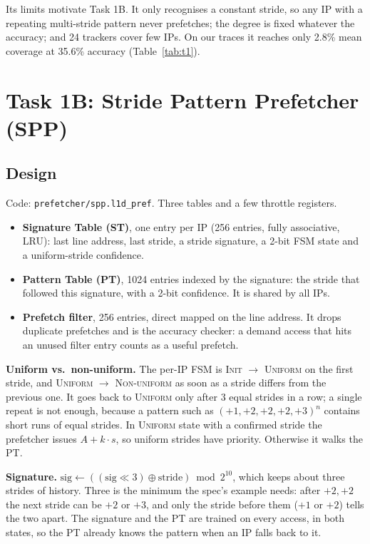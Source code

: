 \documentclass[12pt]{report}
\newcommand{\cfg}[1]{\texttt{#1}}
\begin{document}
Its limits motivate Task 1B. It only recognises a constant stride, so any IP
with a repeating multi-stride pattern never prefetches; the degree is fixed
whatever the accuracy; and 24 trackers cover few IPs. On our traces it
reaches only 2.8\% mean coverage at 35.6\% accuracy (Table~\ref{tab:t1}).

\chapter{Task 1B: Stride Pattern Prefetcher (SPP)}

\section{Design}

Code: \cfg{prefetcher/spp.l1d\_pref}. Three tables and a few throttle
registers.

\begin{itemize}
  \item \textbf{Signature Table (ST)}, one entry per IP (256 entries, fully
  associative, LRU): last line address, last stride, a stride signature, a
  2-bit FSM state and a uniform-stride confidence.
  \item \textbf{Pattern Table (PT)}, 1024 entries indexed by the signature:
  the stride that followed this signature, with a 2-bit confidence. It is
  shared by all IPs.
  \item \textbf{Prefetch filter}, 256 entries, direct mapped on the line
  address. It drops duplicate prefetches and is the accuracy checker: a demand
  access that hits an unused filter entry counts as a useful prefetch.
\end{itemize}

\textbf{Uniform vs.\ non-uniform.} The per-IP FSM is
\textsc{Init} $\to$ \textsc{Uniform} on the first stride, and \textsc{Uniform}
$\to$ \textsc{Non-uniform} as soon as a stride differs from the previous one.
It goes back to \textsc{Uniform} only after 3 equal strides in a row; a
single repeat is not enough, because a pattern such as
$(+1,+2,+2,+2,+3)^n$ contains short runs of equal strides. In
\textsc{Uniform} state with a confirmed stride the prefetcher issues
$A+k\cdot s$, so uniform strides have priority. Otherwise it walks the PT.

\textbf{Signature.} $\text{sig} \leftarrow ((\text{sig} \ll 3) \oplus
\text{stride}) \bmod 2^{10}$, which keeps about three strides of history. Three
is the minimum the spec's example needs: after $+2,+2$ the next stride can be
$+2$ or $+3$, and only the stride before them ($+1$ or $+2$) tells the two
apart. The signature and the PT are trained on every access, in both states,
so the PT already knows the pattern when an IP falls back to it.
\end{document}
